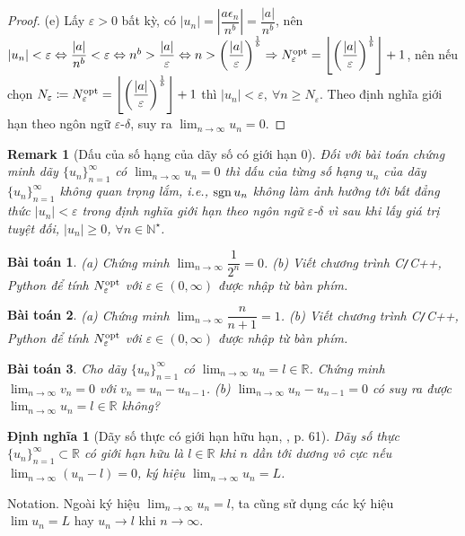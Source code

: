 \documentclass{article}
\newtheorem{baitoan}{Bài toán}
\newtheorem{dinhnghia}{Định nghĩa}
\newtheorem{remark}{Remark}
\begin{document}
\begin{proof}
	\item(e) Lấy $\varepsilon > 0$ bất kỳ, có $|u_n| = \left|\dfrac{a\epsilon_n}{n^b}\right| = \dfrac{|a|}{n^b}$, nên $|u_n| < \varepsilon\Leftrightarrow\dfrac{|a|}{n^b} < \varepsilon\Leftrightarrow n^b > \dfrac{|a|}{\varepsilon}\Leftrightarrow n > \left(\dfrac{|a|}{\varepsilon}\right)^{\frac{1}{b}}\Rightarrow N_\varepsilon^{\rm opt} = \left\lfloor\left(\dfrac{|a|}{\varepsilon}\right)^{\frac{1}{b}}\right\rfloor + 1$, nên nếu chọn $N_\varepsilon\coloneqq N_\varepsilon^{\rm opt} = \left\lfloor\left(\dfrac{|a|}{\varepsilon}\right)^{\frac{1}{b}}\right\rfloor + 1$ thì $|u_n| < \varepsilon,\ \forall n\ge N_\varepsilon$. Theo định nghĩa giới hạn theo ngôn ngữ $\varepsilon$-$\delta$, suy ra $\lim_{n\to\infty} u_n = 0$.
\end{proof}

\begin{remark}[Dấu của số hạng của dãy số có giới hạn $0$]
	Đối với bài toán chứng minh dãy $\{u_n\}_{n=1}^\infty$ có $\lim_{n\to\infty} u_n = 0$ thì dấu của từng số hạng $u_n$ của dãy $\{u_n\}_{n=1}^\infty$ không quan trọng lắm, i.e., ${\rm sgn}\,u_n$ không làm ảnh hưởng tới bất đẳng thức $|u_n| < \varepsilon$ trong định nghĩa giới hạn theo ngôn ngữ $\varepsilon$-$\delta$ vì sau khi lấy giá trị tuyệt đối, $|u_n|\ge0$, $\forall n\in\mathbb{N}^\star$.
\end{remark}

\begin{baitoan}
	(a) Chứng minh $\lim_{n\to\infty} \dfrac{1}{2^n} = 0$. (b) Viết chương trình {\sf C{\tt/}C++, Python} để tính $N_\varepsilon^{\rm opt}$ với $\varepsilon\in(0,\infty)$ được nhập từ bàn phím.
\end{baitoan}

\begin{baitoan}
	(a) Chứng minh $\lim_{n\to\infty} \dfrac{n}{n + 1} = 1$. (b) Viết chương trình {\sf C{\tt/}C++, Python} để tính $N_\varepsilon^{\rm opt}$ với $\varepsilon\in(0,\infty)$ được nhập từ bàn phím.
\end{baitoan}

\begin{baitoan}
	Cho dãy $\{u_n\}_{n=1}^\infty$ có $\lim_{n\to\infty} u_n = l\in\mathbb{R}$. Chứng minh $\lim_{n\to\infty} v_n = 0$ với $v_n = u_n - u_{n-1}$. (b) $\lim_{n\to\infty} u_n - u_{n-1} = 0$ có suy ra được $\lim_{n\to\infty} u_n = l\in\mathbb{R}$ không?
\end{baitoan}

\begin{dinhnghia}[Dãy số thực có giới hạn hữu hạn,  \cite{SGK_Toan_11_CD_tap_1}, p. 61]
	\label{def: sequence lim}
	Dãy số thực $\{u_n\}_{n=1}^\infty\subset\mathbb{R}$ có giới hạn hữu là $l\in\mathbb{R}$ khi $n$ dần tới dương vô cực nếu $\lim_{n\to\infty} (u_n - l) = 0$, ký hiệu $\lim_{n\to\infty} u_n = L$.  
\end{dinhnghia}
{\sf Notation.} Ngoài ký hiệu $\lim_{n\to\infty} u_n = l$, ta cũng sử dụng các ký hiệu $\lim u_n = L$ hay $u_n\to l$ khi $n\to\infty$.
\end{document}

